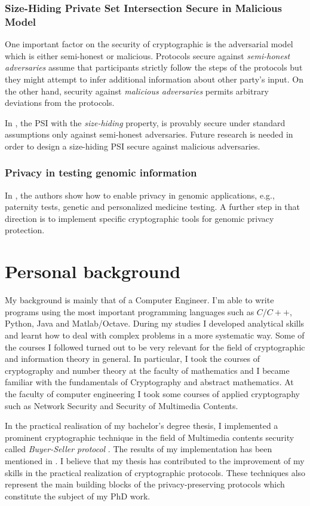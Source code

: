 \documentclass[dvips,12pt]{article}
\begin{document}
\subsubsection{Size-Hiding Private Set Intersection Secure in Malicious Model}
One important factor on the security of cryptographic is the adversarial model which is either semi-honest or malicious. Protocols secure against \emph{semi-honest adversaries} assume that participants strictly follow the steps of the protocols but they might attempt to infer additional information about other party's input. On the other hand, security against \emph{malicious adversaries} permits arbitrary deviations from the protocols.

In \cite{size-psi}, the PSI with the \emph{size-hiding} property, is provably secure under standard assumptions only against semi-honest adversaries. Future research is needed in order to design a size-hiding PSI secure against malicious adversaries.  
\subsubsection{Privacy in testing genomic information}
In \cite{genome}, the authors show how to enable privacy in genomic applications, e.g., paternity tests, genetic and personalized medicine testing. A further step in that direction is to implement specific cryptographic tools for genomic privacy protection.

\section{Personal background}
My background is mainly that of a Computer Engineer.
I'm able to write programs using the most important programming languages such as $C / C++$, Python, Java and Matlab/Octave.
During my studies I developed analytical skills and learnt how to deal with complex problems in a more systematic way. Some of the courses I followed turned out to be very relevant for the field of cryptographic and information theory in general. 
In particular, I took the courses of cryptography and number theory at the faculty of mathematics and I became familiar with the fundamentals of Cryptography and abstract mathematics.
At the faculty of computer engineering I took some courses of applied cryptography such as Network Security and Security of Multimedia Contents.

In the practical realisation of my bachelor's degree thesis, I implemented a prominent cryptographic technique in the field of Multimedia contents security called \emph{Buyer-Seller protocol} \cite{tesi}. 
The results of my implementation has been mentioned in \cite{tesi2}.
I believe that my thesis has contributed to the improvement of my skills in the practical realization of  cryptographic protocols. These techniques also represent the main building blocks of the privacy-preserving protocols which constitute the subject of my PhD work.
\end{document}
